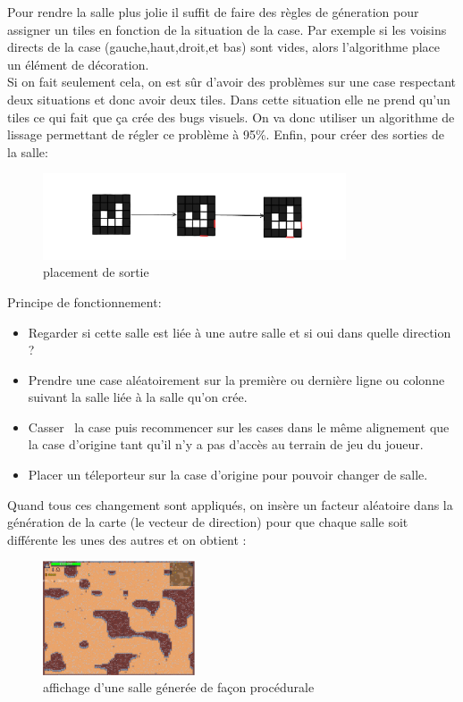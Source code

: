 \documentclass[a4paper,11pt]{article}
\begin{document}
Pour rendre la salle plus jolie il suffit de faire des règles de géneration pour assigner un tiles en fonction de la situation de la case. Par exemple si les voisins directs de la case (gauche,haut,droit,et bas) sont vides, alors l'algorithme place un élément de décoration.\\
Si on fait seulement cela, on est sûr d'avoir des problèmes sur une case respectant deux situations et donc avoir deux tiles. Dans cette situation elle ne prend qu'un tiles ce qui fait que ça crée des bugs visuels. On va donc utiliser un algorithme de lissage permettant de régler ce problème à 95\%.
\newpage
Enfin, pour créer des sorties de la salle:
\begin{figure}[h]
    \centering
    \includegraphics[width=0.8\textwidth]{./img/placementSortie.png}
    \caption{placement de sortie}
    \label{fig:exemple placement de sorties}
\end{figure}

Principe de fonctionnement:
\begin{itemize}
    \item Regarder si cette salle est liée à une autre salle et si oui dans quelle direction ?
    \item Prendre une case aléatoirement sur la première ou dernière ligne ou colonne suivant la salle liée à la salle qu'on crée. 
    \item \guillemotleft Casser \guillemotright \ la case puis recommencer sur les cases dans le même alignement que la case d'origine tant qu'il n'y a pas d'accès au terrain de jeu du joueur.
    \item Placer un téleporteur sur la case d'origine pour pouvoir changer de salle.
\end{itemize}

\bigskip
Quand tous ces changement sont appliqués, on insère un facteur aléatoire dans la génération de la carte (le vecteur de direction) pour que chaque salle soit différente les unes des autres et on obtient : 

\begin{figure}[h]
\centering
\includegraphics[width=0.4\textwidth]{./img/SalleFinal.png}
\caption{affichage d'une salle génerée de façon procédurale}
\label{fig:affichage de la salle final}
\end{figure}
\end{document}
